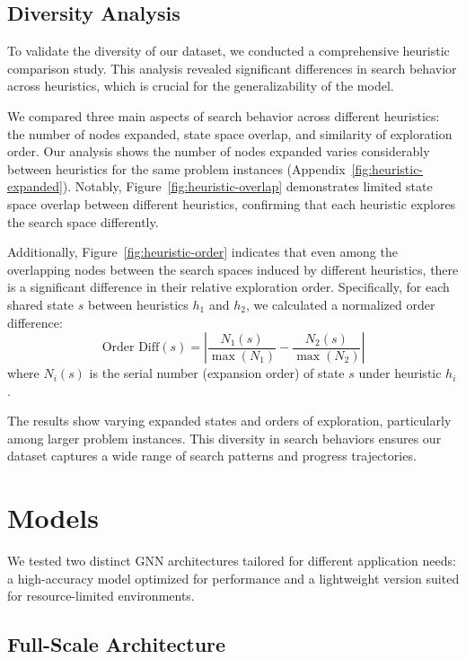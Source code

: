 \documentclass[letterpaper]{article}
\begin{document}
\subsection{Diversity Analysis}

To validate the diversity of our dataset, we conducted a comprehensive heuristic comparison study. This analysis revealed significant differences in search behavior across heuristics, which is crucial for the generalizability of the model.

We compared three main aspects of search behavior across different heuristics: the number of nodes expanded, state space overlap, and similarity of exploration order.
Our analysis shows the number of nodes expanded varies considerably between heuristics for the same problem instances (Appendix~\ref{fig:heuristic-expanded}). Notably, Figure~\ref{fig:heuristic-overlap} demonstrates limited state space overlap between different heuristics, confirming that each heuristic explores the search space differently.

Additionally, Figure~\ref{fig:heuristic-order} indicates that even among the overlapping nodes between the search spaces induced by different heuristics, there is a significant difference in their relative exploration order. Specifically, for each shared state $s$ between heuristics $h_1$ and $h_2$, we calculated a normalized order difference:
\begin{equation}\label{eq:order-diff}
    \text{Order Diff}(s) = \left|\frac{N_1(s)}{\max(N_1)} - \frac{N_2(s)}{\max(N_2)}\right|
\end{equation}
where $N_i(s)$ is the serial number (expansion order) of state $s$ under heuristic $h_i$.

The results show varying expanded states and orders of exploration, particularly among larger problem instances. This diversity in search behaviors ensures our dataset captures a wide range of search patterns and progress trajectories.

\section{Models} \label{sec:models}

We tested two distinct GNN architectures tailored for different application needs: a high-accuracy model optimized for performance and a lightweight version suited for resource-limited environments.

\subsection{Full-Scale Architecture}
\end{document}
